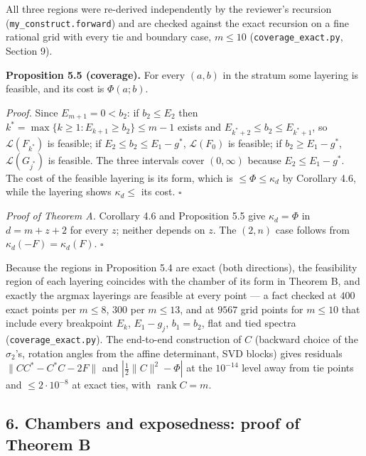 \documentclass[
  11pt,
  a4paper,
]{article}
\begin{document}
All three regions were re-derived independently by the reviewer's
recursion ({\small\texttt{my\_\allowbreak{}construct.\allowbreak{}forward}}) and are checked against the
exact recursion on a fine rational grid with every tie and boundary
case, \(m\le10\) ({\small\texttt{coverage\_\allowbreak{}exact.\allowbreak{}py}}, Section 9).

\textbf{Proposition 5.5 (coverage).} For every \((a,\allowbreak{}b)\) in the stratum
some layering is feasible, and its cost is \(\Phi(a;\allowbreak{}b)\).

\emph{Proof.} Since \(E_{m+1}=0<b_2\): if \(b_2\le E_2\) then
\(k^*=\max\{k\ge1:E_{k+1}\ge b_2\}\le m-1\) exists and
\(E_{k^*+2}\le b_2\le E_{k^*+1}\), so \(\mathcal L(F_{k^*})\) is
feasible; if \(E_2\le b_2\le E_1-g^*\), \(\mathcal L(F_0)\) is feasible;
if \(b_2\ge E_1-g^*\), \(\mathcal L(G_{j^*})\) is feasible. The three
intervals cover \((0,\allowbreak{}\infty)\) because \(E_2\le E_1-g^*\). The cost of
the feasible layering is its form, which is \(\le\Phi\le\kappa_d\) by
Corollary 4.6, while the layering shows \(\kappa_d\le\) its cost.
\(\square\)

\emph{Proof of Theorem A.} Corollary 4.6 and Proposition 5.5 give
\(\kappa_d=\Phi\) in \(d=m+z+2\) for every \(z\); neither depends on
\(z\). The \((2,\allowbreak{}n)\) case follows from \(\kappa_d(-F)=\kappa_d(F)\).
\(\square\)

Because the regions in Proposition 5.4 are exact (both directions), the
feasibility region of each layering coincides with the chamber of its
form in Theorem B, and exactly the argmax layerings are feasible at
every point --- a fact checked at \(400\) exact points per \(m\le8\),
\(300\) per \(m\le13\), and at \(9567\) grid points for \(m\le10\) that
include every breakpoint \(E_k\), \(E_1-g_j\), \(b_1=b_2\), flat and
tied spectra ({\small\texttt{coverage\_\allowbreak{}exact.\allowbreak{}py}}). The end-to-end construction
of \(C\) (backward choice of the \(\sigma_2\)'s, rotation angles from
the affine determinant, SVD blocks) gives residuals \(\|CC^*-C^*C-2F\|\)
and \(|\tfrac12\|C\|^2-\Phi|\) at the \(10^{-14}\) level away from tie
points and \(\le2\cdot10^{-8}\) at exact ties, with
\(\operatorname{rank}C=m\).

\subsection{6. Chambers and exposedness: proof of Theorem
B}\label{chambers-and-exposedness-proof-of-theorem-b}
\end{document}
